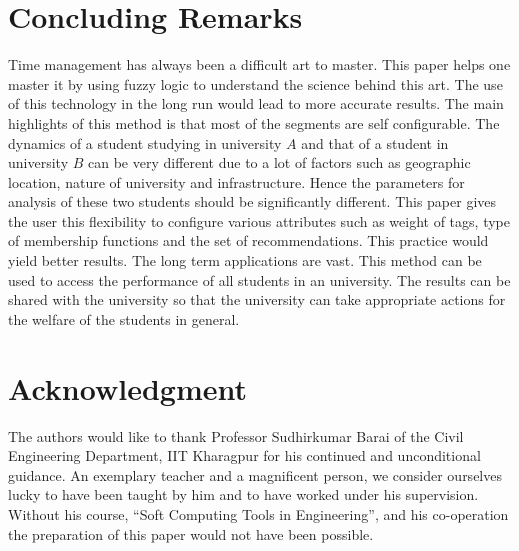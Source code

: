 \documentclass[conference]{IEEEtran}
\newcommand{\quotes}[1]{``#1''}
\begin{document}
%
\section{Concluding Remarks}
Time management has always been a difficult art to master. This paper helps one master it by using fuzzy logic to understand the science behind this art. The use of this technology in the long run would lead to more accurate results. The main highlights of this method is that most of the segments are self configurable. The dynamics of a student studying in university $A$ and that of a student in university $B$ can be very different due to a lot of factors such as geographic location, nature of university and infrastructure. Hence the parameters for analysis of these two students should be significantly different. This paper gives the user this flexibility to configure various attributes such as weight of tags, type of membership functions and the set of recommendations. This practice would yield better results.
The long term applications are vast. This method can be used to access the performance of all students in an university. The results can be shared with the university so that the university can take appropriate actions for the welfare of the students in general.
\section*{Acknowledgment}
The authors would like to thank Professor Sudhirkumar Barai of the Civil Engineering Department, IIT Kharagpur for his continued and unconditional guidance. An exemplary teacher and a magnificent person, we consider ourselves lucky to have been taught by him and to have worked under his supervision. Without his course, \quotes{Soft Computing Tools in Engineering}, and his co-operation the preparation of this paper would not have been possible.
\vspace{34em}
\end{document}
